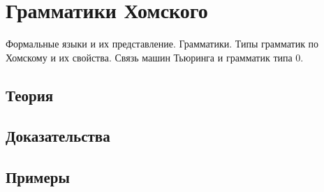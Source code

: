 
\section{Грамматики Хомского}
\label{sec:2.3a.06-grammars-chomsky}

\begin{ticket}
Формальные языки и их представление. Грамматики. Типы грамматик по Хомскому и их свойства. Связь машин Тьюринга и грамматик типа 0.
\end{ticket}

\subsection*{Теория}

\subsection*{Доказательства}

\subsection*{Примеры}
